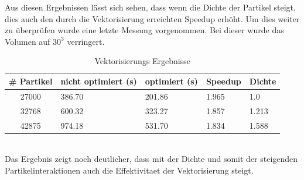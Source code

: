 \documentclass[
12pt,
a4paper,
BCOR10mm,
DIV14,
headsepline,
]{scrreprt}
\begin{document}
	Aus diesen Ergebnissen lässt sich sehen, dass wenn die Dichte der Partikel steigt, dies auch den durch die Vektorisierung erreichten Speedup erhöht. Um dies weiter zu überprüfen wurde eine letzte Messung vorgenommen. Bei dieser wurde das Volumen auf $30^3$ verringert.
	\begin{table}[h]
		\centering
		\begin{tabular}{c|l|l|l|l}
			\# Partikel & nicht optimiert (s) & optimiert (s) & Speedup & Dichte\\
			\hline
			27000 & 386.70 & 201.86 & 1.965 & 1.0\\
			\hline
			32768 &  600.32 & 323.27 & 1.857 & 1.213\\
			\hline
			42875 & 974.18 & 531.70 & 1.834 & 1.588\\
			\hline
		\end{tabular}
		\caption{Vektorisierungs Ergebnisse}
		\label{table:VecErg1}
	\end{table}\\
	Das Ergebnis zeigt noch deutlicher, dass mit der Dichte und somit der steigenden Partikelinteraktionen auch die Effektivitaet der Vektorisierung steigt.
	\newpage
\end{document}
